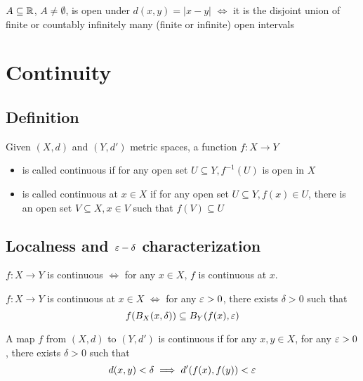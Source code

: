\begin{theorem}
  $A \subseteq \mathbb R$, $A \neq \emptyset$, is open under $d(x, y) = |x-y|$ $\iff$ 
  it is the disjoint union of finite or countably infinitely many (finite or infinite) open intervals
\end{theorem}

\section{Continuity}

\subsection{Definition}

\begin{definition}
  Given $(X, d)$ and $(Y, d')$ metric spaces, a function $f: X \to Y$ 
  \begin{itemize}
    \item is called continuous if for any open set $U \subseteq Y, f^{-1}(U)$ is open in $X$
    \item is called continuous at $x \in X$ if for any open set $U \subseteq Y, f(x) \in U$,
    there is an open set $V \subseteq X, x \in V$ such that $f(V) \subseteq U$ 
  \end{itemize}
\end{definition}

\subsection{Localness and $\varepsilon-\delta$ characterization}

\begin{theorem}
  $f: X \to Y$ is continuous $\iff$ for any $x \in X$, $f$ is continuous at $x$.
\end{theorem}

\begin{theorem}
  $f: X \to Y$ is continuous at $x \in X$ $\iff$ for any $\varepsilon > 0$,
  there exists $\delta > 0$ such that 
  \[f(B_X(x, \delta)) \subseteq B_Y(f(x), \varepsilon)\]
\end{theorem}

\begin{theorem}
  A map $f$ from $(X, d)$ to $(Y, d')$ is continuous if for any $x, y \in X$,
  for any $\varepsilon > 0$, there exists $\delta > 0$ such that 
  \[d(x, y) < \delta \implies d'(f(x), f(y)) < \varepsilon\]
\end{theorem}

